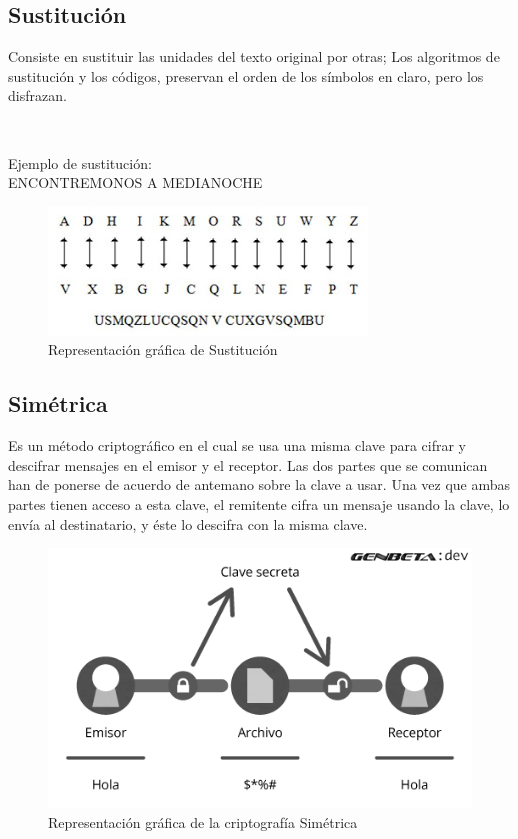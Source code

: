 \documentclass[11pt, conference]{IEEEtran}
\begin{document}
\subsection{Sustitución}
Consiste en sustituir las unidades del texto original por otras; Los algoritmos de sustitución y los códigos, preservan el orden de los símbolos en claro, pero los disfrazan.

\

Ejemplo de sustitución:\\
ENCONTREMONOS A MEDIANOCHE


\begin{figure}[h]
	\begin{center}
		\includegraphics[scale=0.7]{2.jpg}
		\caption{Representación gráfica de Sustitución} 
	\end{center}
\end{figure}

\subsection{Simétrica}
Es un método criptográfico en el cual se usa una misma clave para cifrar y descifrar mensajes en el emisor y el receptor. Las dos partes que se comunican han de ponerse de acuerdo de antemano sobre la clave a usar. Una vez que ambas partes tienen acceso a esta clave, el remitente cifra un mensaje usando la clave, lo envía al destinatario, y éste lo descifra con la misma clave.\cite{e}

\begin{figure}[h]
	\begin{center}
		\includegraphics[scale=0.35]{clasico.png}
		\caption{Representación gráfica de la criptografía Simétrica} 
	\end{center}
\end{figure}
\end{document}
